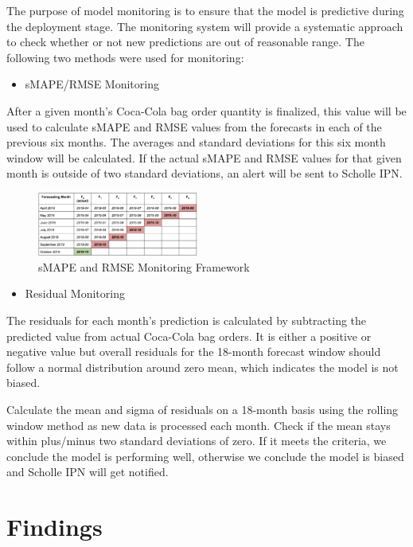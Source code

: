 \documentclass[12pt,oneside]{chicagocapstone}
\providecommand{\tightlist}{%
  \setlength{\itemsep}{0pt}\setlength{\parskip}{0pt}}
\begin{document}
The purpose of model monitoring is to ensure that the model is predictive during the deployment stage. The monitoring system will provide a systematic approach to check whether or not new predictions are out of reasonable range. The following two methods were used for monitoring:
\begin{itemize}
\tightlist
\item
  sMAPE/RMSE Monitoring
\end{itemize}
After a given month's Coca-Cola bag order quantity is finalized, this value will be used to calculate sMAPE and RMSE values from the forecasts in each of the previous six months. The averages and standard deviations for this six month window will be calculated. If the actual sMAPE and RMSE values for that given month is outside of two standard deviations, an alert will be sent to Scholle IPN.
\begin{figure}

{\centering \includegraphics[width=200px,angle = 0, scale=2.1]{figure/sMAPE_monitoring} 

}

\caption{sMAPE and RMSE Monitoring Framework}\label{fig:GoogleTrends4}
\end{figure}
\begin{itemize}
\tightlist
\item
  Residual Monitoring
\end{itemize}
The residuals for each month's prediction is calculated by subtracting the predicted value from actual Coca-Cola bag orders. It is either a positive or negative value but overall residuals for the 18-month forecast window should follow a normal distribution around zero mean, which indicates the model is not biased.

Calculate the mean and sigma of residuals on a 18-month basis using the rolling window method as new data is processed each month. Check if the mean stays within plus/minus two standard deviations of zero. If it meets the criteria, we conclude the model is performing well, otherwise we conclude the model is biased and Scholle IPN will get notified.

\hypertarget{findings}{%
\chapter*{Findings}\label{findings}}
\end{document}
